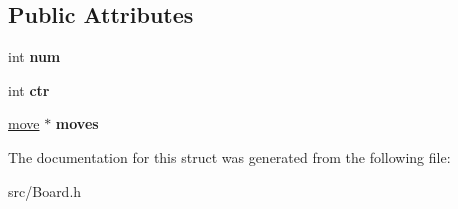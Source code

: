 \subsection*{Public Attributes}
\begin{DoxyCompactItemize}
\item 
\mbox{\label{structmoveArray_a5613065aad1d00414461f416c6b4b724}} 
int {\bfseries num}
\item 
\mbox{\label{structmoveArray_a9dbadb0980be9c133d9587c8572a1c49}} 
int {\bfseries ctr}
\item 
\mbox{\label{structmoveArray_a6f6b1dbbae6cdaea0e321c58a8a1d4ce}} 
\hyperlink{structmove}{move} $\ast$ {\bfseries moves}
\end{DoxyCompactItemize}


The documentation for this struct was generated from the following file\+:\begin{DoxyCompactItemize}
\item 
src/Board.\+h\end{DoxyCompactItemize}
